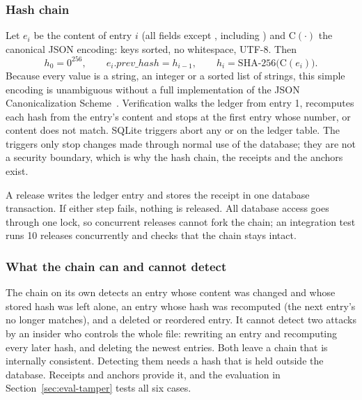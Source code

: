 \subsubsection{Hash chain}
Let $e_i$ be the content of entry $i$ (all fields except , including ) and $\mathrm{C}(\cdot)$ the canonical JSON encoding: keys sorted, no whitespace, UTF-8. Then
\begin{equation}
h_0 = 0^{256}, \qquad e_i.\mathit{prev\_hash} = h_{i-1}, \qquad h_i = \mathrm{SHA\mbox{-}256}\bigl(\mathrm{C}(e_i)\bigr).
\end{equation}
Because every value is a string, an integer or a sorted list of strings, this simple encoding is unambiguous without a full implementation of the JSON Canonicalization Scheme~\cite{rfc8785}. Verification walks the ledger from entry 1, recomputes each hash from the entry's content and stops at the first entry whose number,  or content does not match. SQLite triggers abort any  or  on the ledger table. The triggers only stop changes made through normal use of the database; they are not a security boundary, which is why the hash chain, the receipts and the anchors exist.

A release writes the ledger entry and stores the receipt in one database transaction. If either step fails, nothing is released. All database access goes through one lock, so concurrent releases cannot fork the chain; an integration test runs 10 releases concurrently and checks that the chain stays intact.

\subsubsection{What the chain can and cannot detect}
The chain on its own detects an entry whose content was changed and whose stored hash was left alone, an entry whose hash was recomputed (the next entry's  no longer matches), and a deleted or reordered entry. It cannot detect two attacks by an insider who controls the whole file: rewriting an entry and recomputing every later hash, and deleting the newest entries. Both leave a chain that is internally consistent. Detecting them needs a hash that is held outside the database. Receipts and anchors provide it, and the evaluation in Section~\ref{sec:eval-tamper} tests all six cases.

